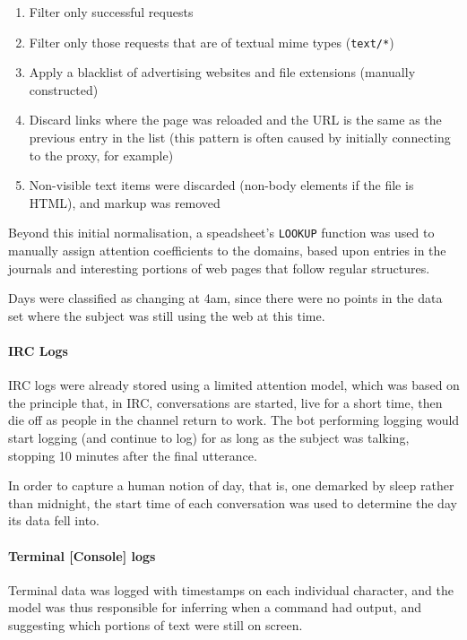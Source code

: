 \begin{enumerate}
    \item Filter only successful requests
    \item Filter only those requests that are of textual mime types (\texttt{text/*})
    \item Apply a blacklist of advertising websites and file extensions (manually constructed)
    \item Discard links where the page was reloaded and the URL is the same as the previous entry in the list (this pattern is often caused by initially connecting to the proxy, for example)
    \item Non-visible text items were discarded (non-body elements if the file is HTML), and markup was removed
\end{enumerate}

Beyond this initial normalisation, a speadsheet's \texttt{LOOKUP} function was used to manually assign attention coefficients to the domains, based upon entries in the journals and interesting portions of web pages that follow regular structures.

Days were classified as changing at 4am, since there were no points in the data set where the subject was still using the web at this time.



\paragraph{IRC Logs}
IRC logs were already stored using a limited attention model, which was based on the principle that, in IRC, conversations are started, live for a short time, then die off as people in the channel return to work.  The bot performing logging would start logging (and continue to log) for as long as the subject was talking, stopping 10 minutes after the final utterance.

In order to capture a human notion of day, that is, one demarked by sleep rather than midnight, the start time of each conversation was used to determine the day its data fell into.



\paragraph{Terminal [Console] logs}
Terminal data was logged with timestamps on each individual character, and the model was thus responsible for inferring when a command had output, and suggesting which portions of text were still on screen.

